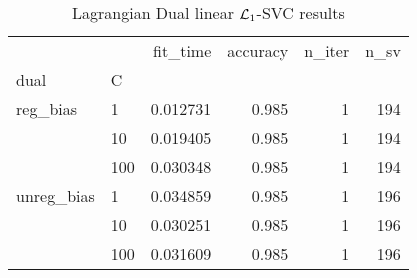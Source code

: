 \begin{table}[H]
\centering
\caption{Lagrangian Dual linear $\protect \mathcal{L}_1$-SVC results}
\label{linear_lagrangian_dual_l1_svc_cv_results}
\begin{tabular}{llrrrr}
\toprule
           &     &  fit\_time &  accuracy &  n\_iter &  n\_sv \\
dual & C &           &           &         &       \\
\midrule
reg\_bias & 1   &  0.012731 &     0.985 &       1 &   194 \\
           & 10  &  0.019405 &     0.985 &       1 &   194 \\
           & 100 &  0.030348 &     0.985 &       1 &   194 \\
unreg\_bias & 1   &  0.034859 &     0.985 &       1 &   196 \\
           & 10  &  0.030251 &     0.985 &       1 &   196 \\
           & 100 &  0.031609 &     0.985 &       1 &   196 \\
\bottomrule
\end{tabular}
\end{table}
